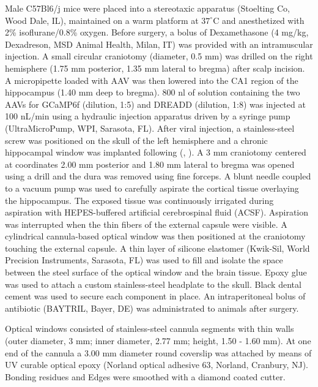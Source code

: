 Male C57Bl6/j mice were placed into a stereotaxic apparatus (Stoelting Co, Wood Dale, IL), maintained on a warm platform at $37^{\circ}$C and anesthetized with 2\% isoflurane/0.8\% oxygen. 
Before surgery, a bolus of Dexamethasone (4 mg/kg, Dexadreson, MSD Animal Health, Milan, IT) was provided with an intramuscular injection. 
A small circular craniotomy (diameter, 0.5 mm) was drilled on the right hemisphere (1.75 mm posterior, 1.35 mm lateral to bregma) after scalp incision. 
A micropipette loaded with AAV was then lowered into the CA1 region of the hippocampus (1.40 mm deep to bregma). 
800 nl of solution containing the two AAVs for GCaMP6f (dilution, 1:5) and DREADD (dilution, 1:8) was injected at 100 nL/min using a hydraulic injection apparatus driven by a syringe pump (UltraMicroPump, WPI, Sarasota, FL). 
After viral injection, a stainless-steel screw was positioned on the skull of the left hemisphere and a chronic hippocampal window was implanted following (\cite{dombeck2010}, \cite{sheffield2015}). 
A 3 mm craniotomy centered at coordinates 2.00 mm posterior and 1.80 mm lateral to bregma was opened using a drill and the dura was removed using fine forceps. 
A blunt needle coupled to a vacuum pump was used to carefully aspirate the cortical tissue overlaying the hippocampus. 
The exposed tissue was continuously irrigated during aspiration with HEPES-buffered artificial cerebrospinal fluid (ACSF). 
Aspiration was interrupted when the thin fibers of the external capsule were visible. 
A cylindrical cannula-based optical window was then positioned at the craniotomy touching the external capsule. 
A thin layer of silicone elastomer (Kwik-Sil, World Precision Instruments, Sarasota, FL) was used to fill and isolate the space between the steel surface of the optical window and the brain tissue. 
Epoxy glue was used to attach a custom stainless-steel headplate to the skull.
Black dental cement was used to secure each component in place.
An intraperitoneal bolus of antibiotic (BAYTRIL, Bayer, DE) was administrated to animals after surgery.

Optical windows consisted of stainless-steel cannula segments with thin walls (outer diameter, 3 mm; inner diameter, 2.77 mm; height, 1.50 - 1.60 mm). 
At one end of the cannula a 3.00 mm diameter round coverslip was attached by means of UV curable optical epoxy (Norland optical adhesive 63, Norland, Cranbury, NJ). 
Bonding residues and Edges were smoothed with a diamond coated cutter.

